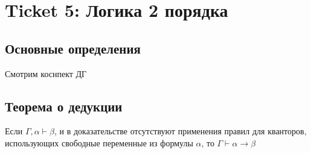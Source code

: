 \section{Ticket 5: Логика 2 порядка}
\label{sec-7}
\subsection{Основные определения}
\label{sec-7-1}
Смотрим коснпект ДГ
\subsection{Теорема о дедукции}
\label{sec-7-2}
\begin{theorem}
Если $\Gamma, \alpha \vdash \beta$, и в доказательстве отсутствуют применения правил для кванторов, использующих свободные переменные  из формулы $\alpha$, то $\Gamma \vdash \alpha \rightarrow \beta$
\end{theorem}
